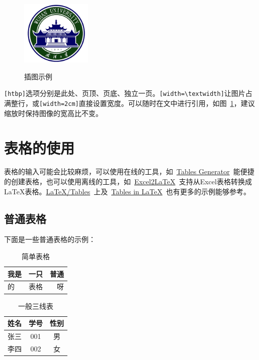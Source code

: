 \begin{figure}[!htb]
  \centering
  \includegraphics[width=0.3\textwidth]
  {figures/whulogo.png}\\
  \caption{插图示例}
  \label{fig:whu}
\end{figure}

\verb|[htbp]|选项分别是此处、页顶、页底、独立一页。\verb|[width=\textwidth]|让图片占满整行，或\verb|[width=2cm]|直接设置宽度。可以随时在文中进行引用，如图~\ref{fig:whu}，建议缩放时保持图像的宽高比不变。

\section{表格的使用}

表格的输入可能会比较麻烦，可以使用在线的工具，如~\href{https://www.tablesgenerator.com/}{Tables Generator}~能便捷的创建表格，也可以使用离线的工具，如~\href{https://ctan.org/pkg/excel2latex}{Excel2LaTeX}~支持从Excel表格转换成\LaTeX{}表格。\href{https://en.wikibooks.org/wiki/LaTeX/Tables}{LaTeX/Tables}~上及~\href{https://www.tug.org/pracjourn/2007-1/mori/mori.pdf}{Tables in LaTeX}~也有更多的示例能够参考。

\subsection{普通表格}
下面是一些普通表格的示例：

\begin{table}[ht]
  \centering
  \caption{简单表格}
  \label{tab:1}
  \begin{tabular}{|l|c|r|}
    \hline
    我是& 一只 & 普通\\
    \hline
    的& 表格& 呀\\
    \hline
  \end{tabular}
\end{table}

\begin{table}[ht]
  \centering
  \caption{一般三线表}
  \label{tab:2}
  \begin{tabular}{ccc}
    \hline
    姓名& 学号& 性别\\
    \hline
    张三& 001& 男\\
    李四& 002& 女\\
    \hline
  \end{tabular}
\end{table}

